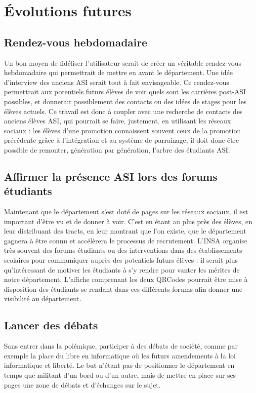 \section{Évolutions futures}
\subsection{Rendez-vous hebdomadaire}
	Un bon moyen de fidéliser l'utilisateur serait de créer un véritable rendez-vous hebdomadaire qui permettrait de mettre en avant le département. Une idée d'interview des anciens ASI serait tout à fait envisageable. Ce rendez-vous permettrait aux potentiels futurs élèves de voir quels sont les carrières post-ASI possibles, et donnerait possiblement des contacts ou des idées de stages pour les élèves actuels. Ce travail est donc à coupler avec une recherche de contacts des anciens élèves ASI, qui pourrait se faire, justement, en utilisant les réseaux sociaux : les élèves d'une promotion connaissent souvent ceux de la promotion précédente grâce à l'intégration et au système de parrainage, il doit donc être possible de remonter, génération par génération, l'arbre des étudiants ASI.
	
\subsection{Affirmer la présence ASI lors des forums étudiants}
	Maintenant que le département s'est doté de pages sur les réseaux sociaux, il est important d'être vu et de donner à voir. C'est en étant au plus près des élèves, en leur distribuant des tracts, en leur montrant que l'on existe, que le département gagnera à être connu et accélèrera le processus de recrutement. L'INSA organise très souvent des forums étudiants ou des interventions dans des établissements scolaires pour communiquer auprès des potentiels futurs élèves : il serait plus qu'intéressant de motiver les étudiants à s'y rendre pour vanter les mérites de notre département. L'affiche comprenant les deux QRCodes pourrait être mise à disposition des étudiants se rendant dans ces différents forums afin donner une visibilité au département.
	
\subsection{Lancer des débats}
	Sans entrer dans la polémique, participer à des débats de société, comme par exemple la place du libre en informatique où les futurs amendements à la loi informatique et liberté. Le but n'étant pas de positionner le département en temps que militant d'un bord ou d'un autre, mais de mettre en place sur ses pages une zone de débats et d'échanges sur le sujet.
